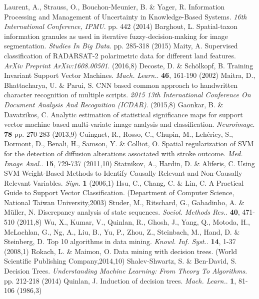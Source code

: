 \documentclass[sn-mathphys-num]{sn-jnl}%
\begin{document}
\begin{thebibliography}{000}
Laurent, A., Strauss, O., Bouchon-Meunier, B. \& Yager, R. Information Processing and Management of Uncertainty in Knowledge-Based Systems. {\em 16th International Conference, IPMU}. pp. 442 (2014)
Barghout, L. Spatial-taxon information granules as used in iterative fuzzy-decision-making for image segmentation. {\em Studies In Big Data}. pp. 285-318 (2015)
Maity, A. Supervised classification of RADARSAT-2 polarimetric data for different land features. {\em ArXiv Preprint ArXiv:1608.00501}. (2016,8)
Decoste, D. \& Schölkopf, B. Training Invariant Support Vector Machines. {\em Mach. Learn.}. \textbf{46}, 161-190 (2002)
Maitra, D., Bhattacharya, U. \& Parui, S. CNN based common approach to handwritten character recognition of multiple scripts. {\em 2015 13th International Conference On Document Analysis And Recognition (ICDAR)}. (2015,8)
Gaonkar, B. \& Davatzikos, C. Analytic estimation of statistical significance maps for support vector machine based multi-variate image analysis and classification. {\em Neuroimage}. \textbf{78} pp. 270-283 (2013,9)
Cuingnet, R., Rosso, C., Chupin, M., Lehéricy, S., Dormont, D., Benali, H., Samson, Y. \& Colliot, O. Spatial regularization of SVM for the detection of diffusion alterations associated with stroke outcome. {\em Med. Image Anal.}. \textbf{15}, 729-737 (2011,10)
Statnikov, A., Hardin, D. \& Aliferis, C. Using SVM Weight-Based Methods to Identify Causally Relevant and Non-Causally Relevant Variables. {\em Sign}. \textbf{1} (2006,1)
Hsu, C., Chang, C. \& Lin, C. A Practical Guide to Support Vector Classification. (Department of Computer Science, National Taiwan University,2003)
Studer, M., Ritschard, G., Gabadinho, A. \& Müller, N. Discrepancy analysis of state sequences. {\em Sociol. Methods Res.}. \textbf{40}, 471-510 (2011,8)
Wu, X., Kumar, V., Quinlan, R., Ghosh, J., Yang, Q., Motoda, H., McLachlan, G., Ng, A., Liu, B., Yu, P., Zhou, Z., Steinbach, M., Hand, D. \& Steinberg, D. Top 10 algorithms in data mining. {\em Knowl. Inf. Syst.}. \textbf{14}, 1-37 (2008,1)
Rokach, L. \& Maimon, O. Data mining with decision trees. (World Scientific Publishing Company,2014,10)
Shalev-Shwartz, S. \& Ben-David, S. Decision Trees. {\em Understanding Machine Learning: From Theory To Algorithms}. pp. 212-218 (2014)
Quinlan, J. Induction of decision trees. {\em Mach. Learn.}. \textbf{1}, 81-106 (1986,3)

\end{thebibliography}
\end{document}
